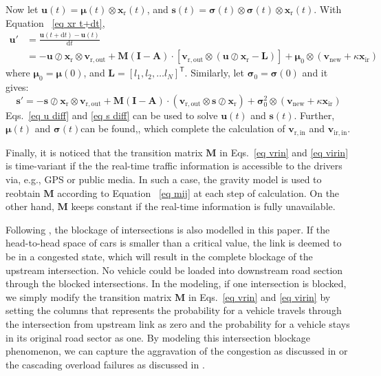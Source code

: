 \documentclass[review,11pt,nonatbib]{elsarticle}
\begin{document}
\par Now let $\mathbf{u}(t)={\bm{\mu}}(t)\otimes \mathbf{x}_{\mathrm{r}}(t)$, and $\mathbf{s}(t)={\bm{\sigma}}(t)\otimes {\bm{\sigma}}(t)\otimes \mathbf{x}_{\mathrm{r}}(t)$. With Equation ~\eqref{eq xr t+dt},
\begin{equation}\label{eq u diff}
\begin{aligned}
\mathbf{u}' &= \frac{\mathbf{u}(t+\mathrm{d}t)-\mathbf{u}(t)}{\mathrm{d}t} \\
&=  - \mathbf{u}\oslash \mathbf{x}_{\mathrm{r}} \otimes\mathbf{v}_{\mathrm{r,out}}+ \mathbf{M}(\mathbf{I}-\mathbf{A})\cdot \left[\mathbf{v}_{\mathrm{r,out}}\otimes(\mathbf{u}\oslash \mathbf{x}_{\mathrm{r}}-\mathbf{L})\right] + {\bm{\mu}_0}\otimes(\mathbf{v}_{\mathrm{new}} +\kappa \mathbf{x}_{\mathrm{ir}})
\end{aligned}
\end{equation}
where  ${\bm{\mu}_0}= {\bm{\mu}}(0)$, and $\mathbf{L}=[l_1,l_2,\ldots l_N]^{\textsf{T}}$. Similarly, let ${\bm{\sigma}_0}= {\bm{\sigma}}(0)$ and it gives:
\begin{equation}\label{eq s diff}
\mathbf{s}' = - \mathbf{s}\oslash \mathbf{x}_{\mathrm{r}} \otimes\mathbf{v}_{\mathrm{r,out}}+ \mathbf{M}(\mathbf{I}-\mathbf{A})\cdot \left(\mathbf{v}_{\mathrm{r,out}}\otimes\mathbf{s}\oslash \mathbf{x}_{\mathrm{r}}\right) + {\bm{\sigma}_0^2}\otimes(\mathbf{v}_{\mathrm{new}} +\kappa \mathbf{x}_{\mathrm{ir}})
\end{equation}
Eqs.~\eqref{eq u diff} and \eqref{eq s diff} can be used to solve $\mathbf{u}(t)$ and $\mathbf{s}(t)$. Further, $\bm{\mu}(t)$ and $\bm{\sigma}(t)$can be found,, which complete the calculation of $\mathbf{v}_{\mathrm{r,in}}$ and $\mathbf{v}_{\mathrm{ir,in}}$.
\par Finally, it is noticed that the transition matrix $\mathbf{M}$ in Eqs.~\eqref{eq vrin} and \eqref{eq virin} is time-variant if the the real-time traffic information is accessible to the drivers via, e.g., GPS or public media. In such a case, the gravity model is used to reobtain $\mathbf{M}$ according to Equation ~\eqref{eq mij} at each step of calculation. On the other hand, $\mathbf{M}$ keeps constant if the real-time information is fully unavailable.

\par Following \citep{feng2017post}, the blockage of intersections is also modelled in this paper. If the head-to-head space of cars is smaller than a critical value, the link is deemed to be in a congested state, which will result in the complete blockage of the upstream intersection. No vehicle could be loaded into downstream road section through the blocked intersections. In the modeling, if one intersection is blocked, we simply modify the transition matrix $\mathbf{M}$  in Eqs.~\eqref{eq vrin} and \eqref{eq virin} by setting the columns that represents the probability for a vehicle travels through the intersection from upstream link as zero and the probability for a vehicle stays in its original road sector as one. By modeling this intersection blockage phenomenon, we can capture the aggravation of the congestion as discussed in \citep{feng2017post} or the cascading overload failures as discussed in \citep{zhao2016spatio}.
\end{document}
